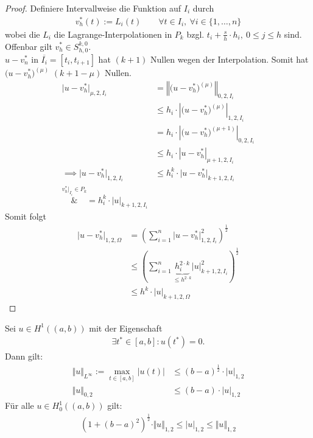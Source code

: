 \begin{proof}
	Definiere Intervallweise die Funktion auf $I_i$ durch
	\begin{align*}
		v_h^\ast(t):=L_i(t)\qquad\forall t\in I_i,~\forall i\in\lbrace1,\ldots,n\rbrace
	\end{align*}
	wobei die $L_i$ die Lagrange-Interpolationen in $P_k$ bzgl. $t_i+\frac{s}{h}\cdot h_i,~0\leq j\leq h$ sind.\\
	Offenbar gilt $v_h^\ast\in S^{k,0}_{h,0}$. \\
	$u-v_n^\ast$ in $\overline{I_i}=[t_i,t_{i+1}]$ hat $(k+1)$ Nullen wegen der Interpolation. Somit hat $\big(u-v_h^\ast)^{(\mu)}$ $(k+1-\mu)$ Nullen.
	\begin{align*}
		\big|u-v_h^\ast\big|_{\mu,2,I_i}
		&=\left\Vert \big(u-v_h^\ast\big)^{(\mu)}\right\Vert_{0,2,I_i}\\
		&\stackrel{}{\leq}
		h_i\cdot\left|\big(u-v_h^\ast\big)^{(\mu)}\right|_{1,2,I_i}\\
		&=h_i\cdot\left|\big(u-v_h^\ast\big)^{(\mu+1)}\right|_{0,2,I_i}\\
		&\leq h_i\cdot\left|u-v_h^\ast\right|_{\mu+1,2,I_i}\\
		\implies
		\big|u-v_h^\ast\big|_{1,2,I_i}
		&\leq h_i^k\cdot\big|u-v_h^\ast\big|_{k+1,2,I_i} \\
		\overset{v_h^\ast|_{I_i}\in P_k}&=
		h_i^k\cdot |u|_{k+1,2,I_i}
	\end{align*} 
	Somit folgt
	\begin{align*}
		\big| u-v_h^\ast\big|_{1,2,\Omega}
		&=\left(\sum\limits_{i=1}^n\big|u-v_h^\ast\big|^2_{1,2,I_i}\right)^{\frac{1}{2}}\\
		&\leq\left(\sum\limits_{i=1}^n \underbrace{h_i^{2\cdot k}}_{\leq h^{2\cdot k}} \big|u\big|^2_{k+1,2,I_i}\right)^{\frac{1}{2}}\\
		&\leq h^k\cdot |u|_{k+1,2,\Omega}
	\end{align*}
\end{proof}

\begin{lemma}\label{lemma4.3}
	Sei $u\in H^1((a,b))$ mit der Eigenschaft
	\begin{align*}
		\exists t^\ast\in[a,b]:u(t^\ast)=0.
	\end{align*}
	Dann gilt:
	\begin{align*}
		\Vert  u\Vert_{L^\infty}:=\max\limits_{t\in [a,b]}\big|u(t)\big|&\leq(b-a)^{\frac{1}{2}}\cdot |u|_{1,2}\\
		\Vert u\Vert_{0,2}&\leq(b-a)\cdot|u|_{1,2}
	\end{align*}
	Für alle $u\in H^1_0((a,b))$ gilt:
	\begin{align*}
		\left(1+(b-a)^2\right)^{\frac{1}{2}}\cdot\Vert u\Vert_{1,2}\leq|u|_{1,2}\leq\Vert u\Vert_{1,2}
	\end{align*}
\end{lemma}

